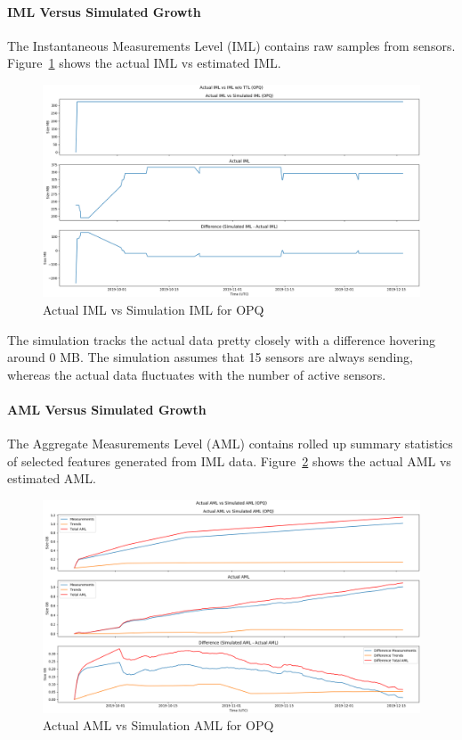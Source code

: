 \paragraph{IML Versus Simulated Growth}
The Instantaneous Measurements Level (IML) contains raw samples from sensors. Figure~\ref{fig:actual_iml_vs_sim_opq} shows the actual IML vs estimated IML.

\begin{figure}[H]
    \centering
    \includegraphics[width=\linewidth]{figures/actual_iml_vs_sim_opq.png}
    \caption{Actual IML vs Simulation IML for OPQ}
    \label{fig:actual_iml_vs_sim_opq}
\end{figure}

The simulation tracks the actual data pretty closely with a difference hovering around 0 MB. The simulation assumes that 15 sensors are always sending, whereas the actual data fluctuates with the number of active sensors.

\paragraph{AML Versus Simulated Growth}
The Aggregate Measurements Level (AML) contains rolled up summary statistics of selected features generated from IML data. Figure~\ref{fig:actual_aml_vs_sim_opq} shows the actual AML vs estimated AML.

\begin{figure}[H]
    \centering
    \includegraphics[width=\linewidth]{figures/actual_aml_vs_sim_opq.png}
    \caption{Actual AML vs Simulation AML for OPQ}
    \label{fig:actual_aml_vs_sim_opq}
\end{figure}

